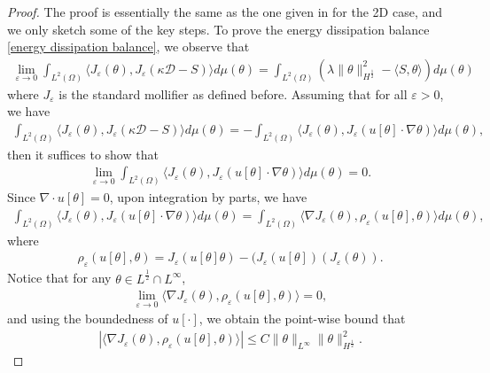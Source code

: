 \documentclass[reqno]{amsart}%
\theoremstyle{definition}
\theoremstyle{remark}
\numberwithin{equation}{section}
\newcommand{\1}{\mathbf{1}}
\numberwithin{equation}{section}
\numberwithin{theorem}{section}
\numberwithin{figure}{section}
\begin{document}
\begin{proof}
The proof is essentially the same as the one given in \cite{CTV14b} for the 2D case, and we only sketch some of the key steps. To prove the energy dissipation balance \eqref{energy dissipation balance}, we observe that
\begin{align*}
\lim_{\varepsilon\to0}\int_{L^2(\Omega)}\langle J_{\varepsilon}(\theta),J_{\varepsilon}(\kappa\mathcal{D}-S)\rangle d\mu(\theta)=\int_{L^2(\Omega)}(\lambda\|\theta\|_{H^\frac{1}{2}}^2-\langle S,\theta\rangle)d\mu(\theta)
\end{align*}
where $J_{\varepsilon}$ is the standard mollifier as defined before. Assuming that for all $\varepsilon>0$, we have
\begin{align}\label{equality on integral with varepsilon}
\int_{L^2(\Omega)}\langle J_{\varepsilon}(\theta),J_{\varepsilon}(\kappa\mathcal{D}-S)\rangle d\mu(\theta)=-\int_{L^2(\Omega)}\langle J_{\varepsilon}(\theta),J_{\varepsilon}(u[\theta]\cdot\nabla\theta)\rangle d\mu(\theta),
\end{align}
then it suffices to show that 
\begin{align}\label{zero limit involving u mu} 
\lim_{\varepsilon\to0}\int_{L^2(\Omega)}\langle J_{\varepsilon}(\theta),J_{\varepsilon}(u[\theta]\cdot\nabla\theta)\rangle d\mu(\theta)=0.
\end{align}
Since $\nabla\cdot u[\theta]=0$, upon integration by parts, we have
\begin{align*}
\int_{L^2(\Omega)}\langle J_{\varepsilon}(\theta),J_{\varepsilon}(u[\theta]\cdot\nabla\theta)\rangle d\mu(\theta)=\int_{L^2(\Omega)}\langle \nabla J_{\varepsilon}(\theta),\rho_{\varepsilon}(u[\theta],\theta)\rangle d\mu(\theta),
\end{align*}
where 
\begin{align}\label{def of rho function with varepsilon}
\rho_{\varepsilon}(u[\theta],\theta)=J_{\varepsilon}(u[\theta]\theta)-(J_{\varepsilon}(u[\theta])(J_{\varepsilon}(\theta)).
\end{align} 
Notice that for any $\theta\in L^\frac{1}{2}\cap L^\infty$,
\begin{align*}
\lim_{\varepsilon\to0}\langle \nabla J_{\varepsilon}(\theta),\rho_{\varepsilon}(u[\theta],\theta)\rangle=0,
\end{align*}
and using the boundedness of $u[\cdot]$, we obtain the point-wise bound that
\begin{align*}
|\langle \nabla J_{\varepsilon}(\theta),\rho_{\varepsilon}(u[\theta],\theta)\rangle|\le C\|\theta\|_{L^\infty}\|\theta\|_{H^\frac{1}{2}}^2.

\end{align*}
\end{proof}
\end{document}
